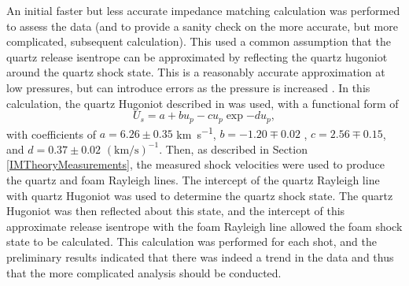 An initial faster but less accurate impedance matching calculation was performed to assess the data (and to provide a sanity check on the more accurate, but more complicated, subsequent calculation). This used a common assumption that the quartz release isentrope can be approximated by reflecting the quartz hugoniot around the quartz shock state. This is a reasonably accurate approximation at low pressures, but can introduce errors as the pressure is increased \cite{Forbes2012}. In this calculation, the quartz Hugoniot described in \cite{Knudson2009} was used, with a functional form of 
\begin{equation} \label{eqn:Old Hugoniot} U_s = a + b u_p - c u_p \exp{-d u_p}, \end{equation}
with coefficients of $a = 6.26 \pm 0.35$ \unit{\kilo\meter\per\second}, $b = -1.20 \mp 0.02$ , $c = 2.56 \mp 0.15$, and $d = 0.37 \pm 0.02$ $(\unit{\kilo\meter\per\second})^{-1}$. Then, as described in Section \ref{IMTheoryMeasurements}, the measured shock velocities were used to produce the quartz and foam Rayleigh lines. The intercept of the quartz Rayleigh line with quartz Hugoniot was used to determine the quartz shock state. The quartz Hugoniot was then reflected about this state, and the intercept of this approximate release isentrope with the foam Rayleigh line allowed the foam shock state to be calculated. This calculation was performed for each shot, and the preliminary results indicated that there was indeed a trend in the data and thus that the more complicated analysis should be conducted.


